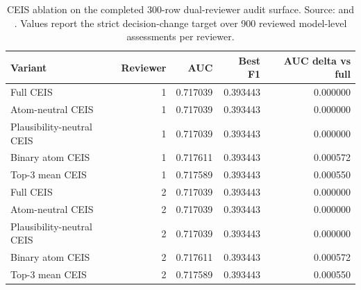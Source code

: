 \begin{table}[htbp]
\centering
\caption{CEIS ablation on the completed 300-row dual-reviewer audit surface. Source:  and . Values report the strict decision-change target over 900 reviewed model-level assessments per reviewer.}
\label{tab:ceis_ablation}
\small
\begin{tabularx}{\linewidth}{@{}Lrrrr@{}}
\toprule
Variant & Reviewer & AUC & Best F1 & AUC delta vs full \\
\midrule
Full CEIS & 1 & 0.717039 & 0.393443 & 0.000000 \\
Atom-neutral CEIS & 1 & 0.717039 & 0.393443 & 0.000000 \\
Plausibility-neutral CEIS & 1 & 0.717039 & 0.393443 & 0.000000 \\
Binary atom CEIS & 1 & 0.717611 & 0.393443 & 0.000572 \\
Top-3 mean CEIS & 1 & 0.717589 & 0.393443 & 0.000550 \\
\addlinespace
Full CEIS & 2 & 0.717039 & 0.393443 & 0.000000 \\
Atom-neutral CEIS & 2 & 0.717039 & 0.393443 & 0.000000 \\
Plausibility-neutral CEIS & 2 & 0.717039 & 0.393443 & 0.000000 \\
Binary atom CEIS & 2 & 0.717611 & 0.393443 & 0.000572 \\
Top-3 mean CEIS & 2 & 0.717589 & 0.393443 & 0.000550 \\
\bottomrule
\end{tabularx}
\end{table}
